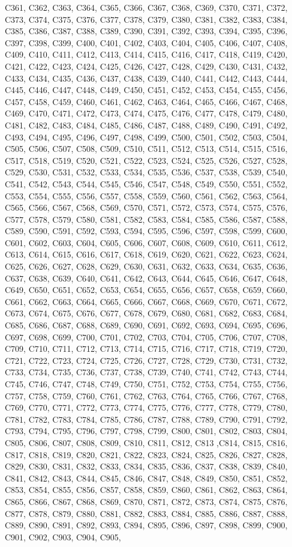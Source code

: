 C361, C362, C363, C364, C365, C366, C367, C368, C369, C370, C371, C372, C373, C374, C375, C376, C377, C378, C379, C380, C381, C382, C383, C384, C385, C386, C387, C388, C389, C390, C391, C392, C393, C394, C395, C396, C397, C398, C399, C400, C401, C402, C403, C404, C405, C406, C407, C408, C409, C410, C411, C412, C413, C414, C415, C416, C417, C418, C419, C420, C421, C422, C423, C424, C425, C426, C427, C428, C429, C430, C431, C432, C433, C434, C435, C436, C437, C438, C439, C440, C441, C442, C443, C444, C445, C446, C447, C448, C449, C450, C451, C452, C453, C454, C455, C456, C457, C458, C459, C460, C461, C462, C463, C464, C465, C466, C467, C468, C469, C470, C471, C472, C473, C474, C475, C476, C477, C478, C479, C480, C481, C482, C483, C484, C485, C486, C487, C488, C489, C490, C491, C492, C493, C494, C495, C496, C497, C498, C499, C500, C501, C502, C503, C504, C505, C506, C507, C508, C509, C510, C511, C512, C513, C514, C515, C516, C517, C518, C519, C520, C521, C522, C523, C524, C525, C526, C527, C528, C529, C530, C531, C532, C533, C534, C535, C536, C537, C538, C539, C540, C541, C542, C543, C544, C545, C546, C547, C548, C549, C550, C551, C552, C553, C554, C555, C556, C557, C558, C559, C560, C561, C562, C563, C564, C565, C566, C567, C568, C569, C570, C571, C572, C573, C574, C575, C576, C577, C578, C579, C580, C581, C582, C583, C584, C585, C586, C587, C588, C589, C590, C591, C592, C593, C594, C595, C596, C597, C598, C599, C600, C601, C602, C603, C604, C605, C606, C607, C608, C609, C610, C611, C612, C613, C614, C615, C616, C617, C618, C619, C620, C621, C622, C623, C624, C625, C626, C627, C628, C629, C630, C631, C632, C633, C634, C635, C636, C637, C638, C639, C640, C641, C642, C643, C644, C645, C646, C647, C648, C649, C650, C651, C652, C653, C654, C655, C656, C657, C658, C659, C660, C661, C662, C663, C664, C665, C666, C667, C668, C669, C670, C671, C672, C673, C674, C675, C676, C677, C678, C679, C680, C681, C682, C683, C684, C685, C686, C687, C688, C689, C690, C691, C692, C693, C694, C695, C696, C697, C698, C699, C700, C701, C702, C703, C704, C705, C706, C707, C708, C709, C710, C711, C712, C713, C714, C715, C716, C717, C718, C719, C720, C721, C722, C723, C724, C725, C726, C727, C728, C729, C730, C731, C732, C733, C734, C735, C736, C737, C738, C739, C740, C741, C742, C743, C744, C745, C746, C747, C748, C749, C750, C751, C752, C753, C754, C755, C756, C757, C758, C759, C760, C761, C762, C763, C764, C765, C766, C767, C768, C769, C770, C771, C772, C773, C774, C775, C776, C777, C778, C779, C780, C781, C782, C783, C784, C785, C786, C787, C788, C789, C790, C791, C792, C793, C794, C795, C796, C797, C798, C799, C800, C801, C802, C803, C804, C805, C806, C807, C808, C809, C810, C811, C812, C813 ,C814, C815, C816, C817, C818, C819, C820, C821, C822, C823, C824, C825, C826, C827, C828, C829, C830, C831, C832, C833, C834, C835, C836, C837, C838, C839, C840, C841, C842, C843, C844, C845, C846, C847, C848, C849, C850, C851, C852, C853, C854, C855, C856, C857, C858, C859, C860, C861, C862, C863, C864, C865, C866, C867, C868, C869, C870, C871, C872, C873, C874, C875, C876, C877, C878, C879, C880, C881, C882, C883, C884, C885, C886, C887, C888, C889, C890, C891, C892, C893, C894, C895, C896, C897, C898, C899, C900, C901, C902, C903, C904, C905, 